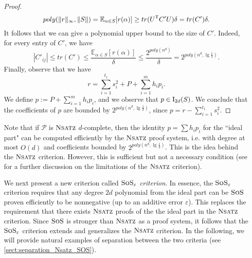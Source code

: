 \documentclass[11pt]{article}
\newcommand{\sos}{\text{\sc{SoS}}}
\newcommand{\Nsatz}{\textsc{Nsatz}}
\newcommand{\I}{\emph{$\rm{I}$}}
\newcommand{\1}{\textbf{1}}
\begin{document}
\begin{proof}
    \begin{align*}
        poly(\| r \|_{\infty}, \| S \|) = \mathbb{E}_{\alpha \in S} [r(\alpha)] \geq tr(U^{\sf{T}} C' U) \delta = tr(C') \delta.
    \end{align*}
    It follows that we can give a polynomial upper bound to the size of $C'$. Indeed, for every entry of $C'$, we have
    \begin{equation*}
        |C'_{ij}| \leq tr(C') \leq \frac{\mathbb{E}_{\alpha \in S} [r(\alpha)]}{\delta} \leq \frac{2^{poly(n^d)}}{\delta} = 2^{poly(n^d, \lg \frac{1}{\delta})}.
    \end{equation*}
    Finally, observe that we have
    $$r=\sum_{i=1}^{t_1}s_i^2 + P + \sum_{i=1}^mh_ip_i.$$
    We define $p:= P + \sum_{i=1}^mh_ip_i$, and we observe that $p\in \I_{2d}(S)$.  We conclude that the coefficients of $p$ are bounded by $2^{poly(n^d, \lg \frac{1}{\delta})}$, since $p=r-\sum_{i=1}^{t_1}s_i^2$.
\end{proof}

Note that if $\mathcal{P}$ is $\Nsatz$ $d$-complete, then the identity $p=\sum h_i p_i$ for the ``ideal part" can be computed efficiently by the $\Nsatz$ proof system, i.e. with degree at most $O(d)$ and coefficients bounded by $2^{poly(n^d, \lg \frac{1}{\delta})}$. This is the idea behind the $\Nsatz$ criterion. However, this is sufficient but not a necessary condition (see \cite{raghavendra_weitz2017} for a further discussion on the limitations of the $\Nsatz$ criterion).

We next present a new criterion called \textit{$\sos_{\varepsilon}$ criterion}. In essence, the $\sos_{\varepsilon}$ criterion requires that any degree $2d$ polynomial from the ideal part can be $\sos$ proven efficiently to be nonnegative (up to an additive error $\varepsilon$).  This replaces the requirement that there exists $\Nsatz$ proofs of the the ideal part in the $\Nsatz$ criterion. Since $\sos$ is stronger than $\Nsatz$ as a proof system, it follows that the $\sos_{\varepsilon}$ criterion extends and generalizes the $\Nsatz$ criterion. In the following, we will provide natural examples of separation between the two criteria (see \cref{sect:separation_Nsatz_SOS}).
\end{document}

